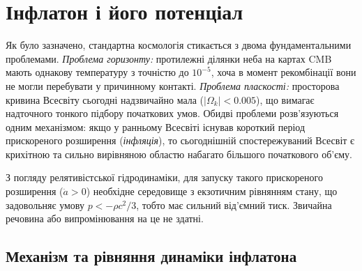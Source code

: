 

\chapter{Інфлатон і його потенціал}
\label{sec:inflaton}

Як було зазначено, стандартна космологія стикається
з двома фундаментальними проблемами. \emph{Проблема горизонту:}
протилежні ділянки неба на картах CMB мають однакову температуру
з точністю до $10^{-5}$, хоча в момент рекомбінації вони не могли
перебувати у причинному контакті. \emph{Проблема пласкості:}
просторова кривина Всесвіту сьогодні надзвичайно мала
($|\Omega_k| < 0.005$), що вимагає надточного тонкого підбору
початкових умов. Обидві проблеми розв'язуються одним механізмом:
якщо у ранньому Всесвіті існував короткий період прискореного
розширення (\emph{інфляція}), то сьогоднішній спостережуваний
Всесвіт є крихітною та сильно вирівняною областю набагато більшого
початкового об'єму.

З погляду релятивістської гідродинаміки, для запуску такого прискореного
розширення ($\ddot{a} > 0$) необхідне середовище з екзотичним рівнянням
стану, що задовольняє умову $p < -\rho c^2 / 3$, тобто має сильний
від'ємний тиск. Звичайна речовина або випромінювання на це не здатні.

\section{Механізм та рівняння динаміки інфлатона}
\label{subsec:inflaton_dynamics}


